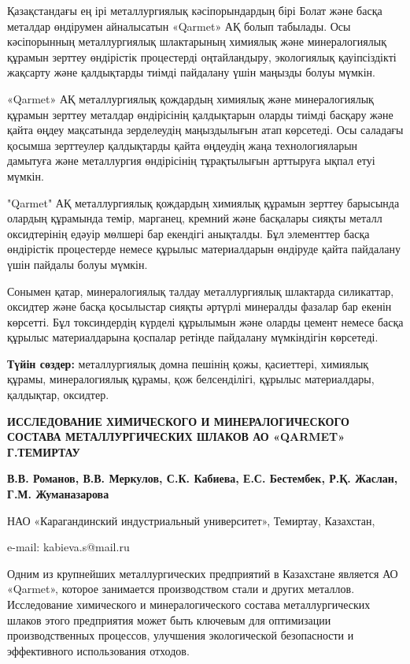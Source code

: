 Қазақстандағы ең ірі металлургиялық кәсіпорындардың бірі Болат және
басқа металдар өндірумен айналысатын «Qarmet» АҚ болып табылады. Осы
кәсіпорынның металлургиялық шлактарының химиялық және минералогиялық
құрамын зерттеу өндірістік процестерді оңтайландыру, экологиялық
қауіпсіздікті жақсарту және қалдықтарды тиімді пайдалану үшін маңызды
болуы мүмкін.

«Qarmet» АҚ металлургиялық қождардың химиялық және минералогиялық
құрамын зерттеу металдар өндірісінің қалдықтарын оларды тиімді басқару
және қайта өңдеу мақсатында зерделеудің маңыздылығын атап көрсетеді. Осы
саладағы қосымша зерттеулер қалдықтарды қайта өңдеудің жаңа
технологияларын дамытуға және металлургия өндірісінің тұрақтылығын
арттыруға ықпал етуі мүмкін.

"Qarmet" АҚ металлургиялық қождардың химиялық құрамын зерттеу барысында
олардың құрамында темір, марганец, кремний және басқалары сияқты металл
оксидтерінің едәуір мөлшері бар екендігі анықталды. Бұл элементтер басқа
өндірістік процестерде немесе құрылыс материалдарын өндіруде қайта
пайдалану үшін пайдалы болуы мүмкін.

Сонымен қатар, минералогиялық талдау металлургиялық шлактарда
силикаттар, оксидтер және басқа қосылыстар сияқты әртүрлі минералды
фазалар бар екенін көрсетті. Бұл токсиндердің күрделі құрылымын және
оларды цемент немесе басқа құрылыс материалдарына қоспалар ретінде
пайдалану мүмкіндігін көрсетеді.

{\bfseries Түйін сөздер:} металлургиялық домна пешінің қожы, қасиеттері,
химиялық құрамы, минералогиялық құрамы, қож белсенділігі, құрылыс
материалдары, қалдықтар, оксидтер.

\begin{center}
{\large\bfseries ИССЛЕДОВАНИЕ ХИМИЧЕСКОГО И МИНЕРАЛОГИЧЕСКОГО СОСТАВА
МЕТАЛЛУРГИЧЕСКИХ ШЛАКОВ АО «QARMET» Г.ТЕМИРТАУ}

{\bfseries В.В. Романов, В.В. Меркулов, С.К. Кабиева\envelope, Е.С. Бестембек, Р.Қ. Жаслан, Г.М. Жуманазарова}

НАО «Карагандинский индустриальный университет», Темиртау, Казахстан,

e-mail: kabieva.s@mail.ru
\end{center}

Одним из крупнейших металлургических предприятий в Казахстане является
АО «Qarmet», которое занимается производством стали и других металлов.
Исследование химического и минералогического состава металлургических
шлаков этого предприятия может быть ключевым для оптимизации
производственных процессов, улучшения экологической безопасности и
эффективного использования отходов.

